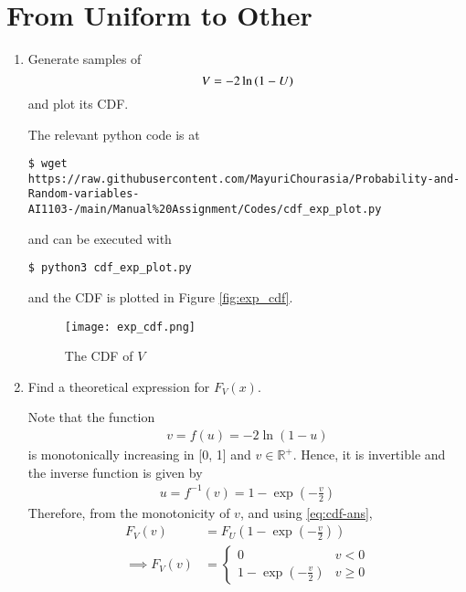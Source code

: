 \documentclass[journal,12pt,twocolumn]{IEEEtran}
\renewcommand\thesection{\arabic{section}}
\begin{document}
\section{From Uniform to Other}
\begin{enumerate}[label=\thesection.\arabic*
,ref=\thesection.\theenumi]
%
\item
Generate samples of 
%
\begin{equation}
V = -2\ln\left(1-U\right)
\end{equation}
%
and plot its CDF. 

\solution
The relevant python code is at
\begin{lstlisting}
$ wget https://raw.githubusercontent.com/MayuriChourasia/Probability-and-Random-variables-AI1103-/main/Manual%20Assignment/Codes/cdf_exp_plot.py
\end{lstlisting}
and can be executed with
\begin{lstlisting}
$ python3 cdf_exp_plot.py
\end{lstlisting}

and the CDF is plotted in Figure \eqref{fig:exp_cdf}.
\begin{figure}
\centering
\texttt{[image: exp\_cdf.png]}
\caption{The CDF of $V$}
\label{fig:exp_cdf}
\end{figure}

\item Find a theoretical expression for $F_V(x)$.

\solution
Note that the function 
		\begin{align}
			v = f(u) = -2\ln{(1 - u)}
		\end{align}
is monotonically increasing in [0, 1] and $v \in \mathbb{R^+}$. Hence, it is invertible and the inverse function is given by
		\begin{align}
			u = f^{-1}(v) = 1 - \exp{\left(-\frac{v}{2}\right)}
		\end{align}
		Therefore, from the monotonicity of $v$, and using \eqref{eq:cdf-ans},
		\begin{align}
			F_V(v) &= F_U\left(1 - \exp{\left(-\frac{v}{2}\right)}\right) \\
			\implies F_V(v) &= 
			\begin{cases}
				0 & v < 0 \\
				1 - \exp{\left(-\frac{v}{2}\right)} & v \geq 0
			\end{cases}
			\label{eq:f-v}
		\end{align}
%
\end{enumerate}
\end{document}
